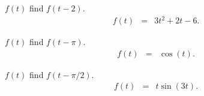 \begin{problem}
\begin{subproblem}
  \item $f(t)$ find $f(t-2)$.
    \begin{eqnarray*}
      f(t) & = & 3t^2 + 2t - 6.
    \end{eqnarray*}
    \vfill

  \item $f(t)$ find $f(t-\pi)$.
    \begin{eqnarray*}
      f(t) & = & \cos(t).
    \end{eqnarray*}
    \vfill

  \item $f(t)$ find $f(t-\pi/2)$.
    \begin{eqnarray*}
      f(t) & = & t\sin(3t).
    \end{eqnarray*}
    \vfill


  \end{subproblem}


\end{problem}


